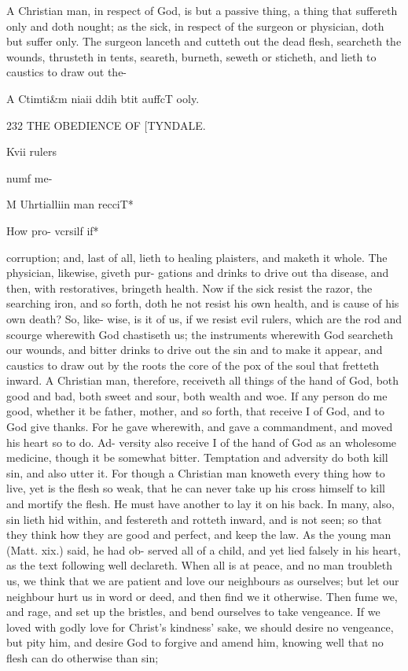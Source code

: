 \documentclass{custom}
\begin{document}
{A Christian man, in respect of God, is but a passive thing,
a thing that suffereth only and doth nought; as the sick, 
in respect of the surgeon or physician, doth but suffer 
only. The surgeon lanceth and cutteth out the dead flesh, 
searcheth the wounds, thrusteth in tents, seareth, burneth, 
seweth or sticheth, and lieth to caustics to draw out the- 

A Ctimti&m 
niaii ddih 
btit auffcT 
ooly. 


232
THE OBEDIENCE OF 
[TYNDALE.

Kvii rulers 

numf me- 

M Uhrtialliin 
man recciT* 

How pro- 
vcrsilf if* 

corruption; and, last of all, lieth to healing plaisters, and 
maketh it whole. The physician, likewise, giveth pur- 
gations and drinks to drive out tha disease, and then, with 
restoratives, bringeth health. Now if the sick resist the 
razor, the searching iron, and so forth, doth he not resist 
his own health, and is cause of his own death? So, like- 
wise, is it of us, if we resist evil rulers, which are the rod
and scourge wherewith God chastiseth us; the instruments 
wherewith God searcheth our wounds, and bitter drinks 
to drive out the sin and to make it appear, and caustics to 
draw out by the roots the core of the pox of the soul that 
fretteth inward. A Christian man, therefore, receiveth all 
things of the hand of God, both good and bad, both sweet 
and sour, both wealth and woe. If any person do me good, 
whether it be father, mother, and so forth, that receive I of 
God, and to God give thanks. For he gave wherewith, and 
gave a commandment, and moved his heart so to do. Ad- 
versity also receive I of the hand of God as an wholesome 
medicine, though it be somewhat bitter. Temptation and 
adversity do both kill sin, and also utter it. For though a 
Christian man knoweth every thing how to live, yet is the 
flesh so weak, that he can never take up his cross himself 
to kill and mortify the flesh. He must have another to 
lay it on his back. In many, also, sin lieth hid within, 
and festereth and rotteth inward, and is not seen; so that 
they think how they are good and perfect, and keep the 
law. As the young man (Matt. xix.) said, he had ob- 
served all of a child, and yet lied falsely in his heart, as 
the text following well declareth. When all is at peace, 
and no man troubleth us, we think that we are patient and 
love our neighbours as ourselves; but let our neighbour 
hurt us in word or deed, and then find we it otherwise.
Then fume we, and rage, and set up the bristles, and bend 
ourselves to take vengeance. If we loved with godly love 
for Christ's kindness' sake, we should desire no vengeance, 
but pity him, and desire God to forgive and amend him, 
knowing well that no flesh can do otherwise than sin;


}
\end{document}
